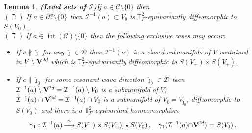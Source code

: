 \documentclass[10pt,a4paper]{amsart}
\newtheorem{lemma}{Lemma}
\newcommand{\T}{{\mathbb T}}
\newcommand{\cC}{{\mathcal C}}
\newcommand{\cD}{{\mathcal D}}
\newcommand{\cI}{{\mathcal I}}
\DeclareMathOperator{\interior}{int}
\DeclareMathOperator*{\toup}{\longrightarrow}
\newcommand{\twod}{{2d}}
\begin{document}
        \begin{lemma}{\bf (Level sets of $\cI$)}\label{prop:levelsets of cI}
           If  $a\in \cC \setminus \{0\} $ then 
    \\[1mm]     
        $(\beth)$
               If $a\in \partial \cC\setminus\{0\}$ then  $\cI^{-1}(a) \subset V_0 $ is $\T^2_\Gamma$-equivariantly diffeomorphic to $S(V_0)$.
               \\[1mm]
  $(\daleth)$
                If $a\in \interior(\cC)\setminus\{0\}  $ then the following exclusive cases may occur:
                \begin{itemize}
                    \item[$(\daleth$1)] 
                     If $a\not \parallel \hat \jmath$ for any $\hat \jmath\in \cD$ then  $\cI^{-1}(a)$ is a closed submanifold of $V$  contained in $V\setminus 
                    {\bf V}^{\twod} $ which is 
                    $\T^2_\Gamma$-equivariantly diffeomorphic to $S(V_-)\times S(V_+) $.
                    
                    \item[$(\daleth$2)] 
                     If $a\parallel \hat \jmath_0$ for some resonant wave direction $\hat \jmath_0\in \cD$
                    then  
 $       \cI^{-1}(a)\setminus {\bf V}^{\twod}  = 
                     \cI^{-1}(a)\setminus  V_0  $
is a submanifold of $  V $, 
       $  \cI^{-1}(a)\cap {\bf V}^{\twod}  = \cI^{-1}(a)\cap V_0 $ is a submanifold of  $ V_0 = V_{\hat \jmath_0} $, diffeomorphic to 
       $ S(V_0) $ 
                      and there is a $\T^2_\Gamma$-equivariant homeomorphism 
                    \begin{equation}\label{gamma homeomorphism_2}
                        \gamma_1:\cI^{-1}(a)\toup^{\cong}[S(V_-)\times S(V_+)] \star S(V_0)\, ,
                        \quad \gamma_1(\cI^{-1}(a) {\cap {\bf V}^{2d}})=S(V_0) \, .
                    \end{equation}
                \end{itemize}
        \end{lemma}    
\end{document}
